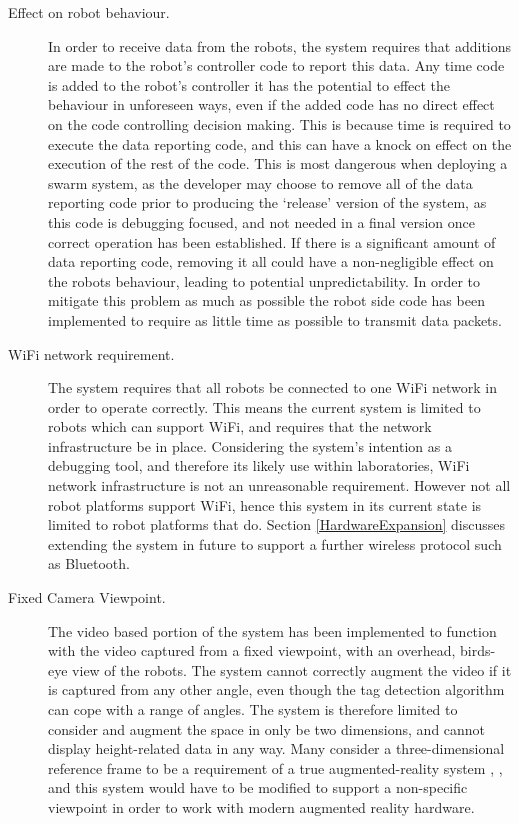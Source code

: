 \begin{description}
 \item [Effect on robot behaviour.] In order to receive data from the robots, the system requires that   additions are made to the robot's controller code to report this data. Any time code is added to the robot's controller it has the potential to effect the behaviour in unforeseen ways, even if the added code has no direct effect on the code controlling decision making. This is because time is required to execute the data reporting code, and this can have a knock on effect on the execution of the rest of the code. This is most dangerous when deploying a swarm system, as the developer may choose to remove all of the data reporting code prior to producing the `release' version of the system, as this code is debugging focused, and not needed in a final version once correct operation has been established. If there is a significant amount of data reporting code, removing it all could have a non-negligible effect on the robots behaviour, leading to potential unpredictability. In order to mitigate this problem as much as possible the robot side code has been implemented to require as little time as possible to transmit data packets.
 
\item [WiFi network requirement.] The system requires that all robots be connected to one WiFi network in order to operate correctly. This means the current system is limited to robots which can support WiFi, and requires that the network infrastructure be in place. Considering the system's intention as a debugging tool, and therefore its likely use within laboratories, WiFi network infrastructure is not an unreasonable requirement. However not all robot platforms support WiFi, hence this system in its current state is limited to robot platforms that do. Section \ref{HardwareExpansion} discusses extending the system in future to support a further wireless protocol such as Bluetooth.

\item [Fixed Camera Viewpoint.] The video based portion of the system has been implemented to function with the video captured from a fixed viewpoint, with an overhead, birds-eye view of the robots. The system cannot correctly augment the video if it is captured from any other angle, even though the tag detection algorithm can cope with a range of angles. The system is therefore limited to consider and augment the space in only be two dimensions, and cannot display height-related data in any way. Many consider a three-dimensional reference frame to be a requirement of a true augmented-reality system \cite{Azuma:1997}, \cite{Billinghurst:2014}, and this system would have to be modified to support a non-specific viewpoint in order to work with modern augmented reality hardware.
\end{description}

